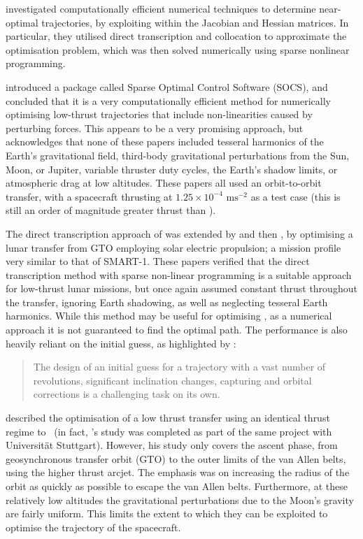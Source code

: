 \textcite{Betts1993} investigated computationally efficient numerical techniques to determine near-optimal trajectories, by exploiting within the Jacobian and Hessian matrices. In particular, they utilised direct transcription and collocation to approximate the optimisation problem, which was then solved numerically using sparse nonlinear programming.
 
\textcite{Betts1994} introduced a package called Sparse Optimal Control Software (SOCS), and concluded that it is a very computationally efficient method for numerically optimising low-thrust trajectories that include non-linearities caused by perturbing forces. This appears to be a very promising approach, but \textcite{Betts2000} acknowledges that none of these papers included tesseral harmonics of the Earth's gravitational field, third-body gravitational perturbations from the Sun, Moon, or Jupiter, variable thruster duty cycles, the Earth's shadow limits, or atmospheric drag at low altitudes. These papers all used an orbit-to-orbit transfer, with a spacecraft thrusting
 at $1.25\times10^{-4}\text{ ms}^{-2}$ as a test case (this is still an order of magnitude greater thrust than \BW).

The direct transcription approach of \textcite{Betts1993} was extended by \textcite{Erb_thesis} and then \textcite{Betts2003}, by optimising a lunar transfer from GTO employing solar electric propulsion; a mission profile very similar to that of SMART-1. These papers verified that the direct transcription method with sparse non-linear programming is a suitable approach for low-thrust lunar missions, but once again assumed constant thrust throughout the transfer, ignoring Earth shadowing, as well as neglecting tesseral Earth harmonics. While this method may be useful for optimising \BW, as a numerical approach it is not guaranteed to find the optimal path. The performance is also heavily reliant on the initial guess, as highlighted by \textcite{Betts2003}: 

\begin{quotation}The design of an initial guess for a trajectory with a vast number of revolutions, significant inclination changes, capturing and orbital corrections is a challenging task on its own.\end{quotation}

\textcite{Letterio_thesis} described the optimisation of a low thrust transfer using an identical thrust regime to \BW\ (in fact, \citeauthor{Letterio_thesis}'s study was completed as part of the same project with Universit\"{a}t Stuttgart). However, his study only covers the ascent phase, from geosynchronous transfer orbit (GTO) to the outer limits of the van Allen belts, using the higher thrust arcjet. The emphasis was on increasing the radius of the orbit as quickly as possible to escape the van Allen belts. Furthermore, at these relatively low altitudes the gravitational perturbations due to the Moon's gravity are fairly uniform. This limits the extent to which they can be exploited to optimise the trajectory of the spacecraft.

